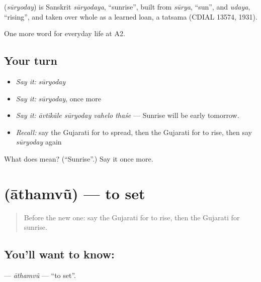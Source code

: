 \begin{cousinweb}
\textbf{} (\emph{sūryoday}) is Sanskrit \emph{sūryodaya}, \textquotedblleft{}sunrise\textquotedblright{}, built from \emph{sūrya}, \textquotedblleft{}sun\textquotedblright{}, and \emph{udaya}, \textquotedblleft{}rising\textquotedblright{}, and taken over whole as a learned loan, a tatsama (CDIAL 13574, 1931).
\end{cousinweb}

\begin{grammarlens}[title={What you've built}]
One more word for everyday life at A2.
\end{grammarlens}

\subsection*{Your turn}
\begin{itemize}
\raggedright
  \item \emph{Say it:} \emph{sūryoday}
  \item \emph{Say it:} \emph{sūryoday}, once more
  \item \emph{Say it:} \emph{āvtīkāle sūryoday vahelo thaśe} — Sunrise will be early tomorrow.
  \item \emph{Recall:} say the Gujarati for to spread, then the Gujarati for to rise, then say \emph{sūryoday} again
\end{itemize}

\begin{tcolorbox}[breakable,colback=teal!4,colframe=teal!35!black,title={Before you move on}]
What does  mean? (\textquotedblleft{}Sunrise\textquotedblright{}.) Say it once more.
\end{tcolorbox}
\section[\texorpdfstring{\gu{આથમવું} (āthamvũ)}{આથમવું (āthamvũ)}]{ (āthamvũ) — to set}

\label{lesson:GU-C218-athamvu}



\begin{quote}
Before the new one: say the Gujarati for to rise, then the Gujarati for sunrise.
\end{quote}

\subsection*{You'll want to know: }
\textbf{} — \emph{āthamvũ} — \textquotedblleft{}to set\textquotedblright{}.

